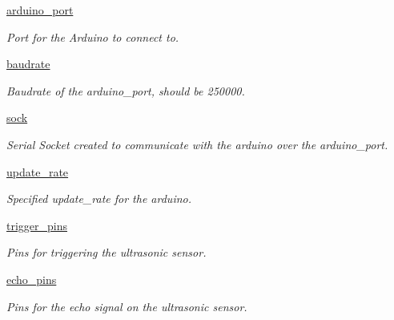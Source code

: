 \begin{DoxyCompactItemize}
\item 
\mbox{\label{classsensor_app_1_1_sensor_app_a1c6f7cac80d19d5870ff22738732fdf4}} 
\mbox{\hyperlink{classsensor_app_1_1_sensor_app_a1c6f7cac80d19d5870ff22738732fdf4}{arduino\+\_\+port}}
\begin{DoxyCompactList}\small\item\em Port for the Arduino to connect to. \end{DoxyCompactList}\item 
\mbox{\label{classsensor_app_1_1_sensor_app_ae2475f8d81d862dd64aff6f9a6a76662}} 
\mbox{\hyperlink{classsensor_app_1_1_sensor_app_ae2475f8d81d862dd64aff6f9a6a76662}{baudrate}}
\begin{DoxyCompactList}\small\item\em Baudrate of the arduino\+\_\+port, should be 250000. \end{DoxyCompactList}\item 
\mbox{\label{classsensor_app_1_1_sensor_app_ae51a9d3921f0adc9031992eea6e707e1}} 
\mbox{\hyperlink{classsensor_app_1_1_sensor_app_ae51a9d3921f0adc9031992eea6e707e1}{sock}}
\begin{DoxyCompactList}\small\item\em Serial Socket created to communicate with the arduino over the arduino\+\_\+port. \end{DoxyCompactList}\item 
\mbox{\label{classsensor_app_1_1_sensor_app_a5f53e6fffcb4e1aedf99d6d73d3f4d51}} 
\mbox{\hyperlink{classsensor_app_1_1_sensor_app_a5f53e6fffcb4e1aedf99d6d73d3f4d51}{update\+\_\+rate}}
\begin{DoxyCompactList}\small\item\em Specified update\+\_\+rate for the arduino. \end{DoxyCompactList}\item 
\mbox{\label{classsensor_app_1_1_sensor_app_a6d9216a1f62c4f9d6502ac876601d687}} 
\mbox{\hyperlink{classsensor_app_1_1_sensor_app_a6d9216a1f62c4f9d6502ac876601d687}{trigger\+\_\+pins}}
\begin{DoxyCompactList}\small\item\em Pins for triggering the ultrasonic sensor. \end{DoxyCompactList}\item 
\mbox{\label{classsensor_app_1_1_sensor_app_a77ad47b625b026d193a7b5e614a5703c}} 
\mbox{\hyperlink{classsensor_app_1_1_sensor_app_a77ad47b625b026d193a7b5e614a5703c}{echo\+\_\+pins}}
\begin{DoxyCompactList}\small\item\em Pins for the echo signal on the ultrasonic sensor. \end{DoxyCompactList}\end{DoxyCompactItemize}


